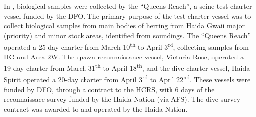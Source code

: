 In \thisYr{}, biological samples were collected by the ``Queens Reach'', a seine test charter vessel funded by the DFO. 
The primary purpose of the test charter vessel was to collect biological samples from main bodies of herring from Haida Gwaii major (priority) and minor stock areas, identified from soundings. 
The ``Queens Reach'' operated a 25-day charter from March 10\textsuperscript{th} to April 3\textsuperscript{rd}, collecting samples from HG and Area 2W. 
The spawn reconnaissance vessel, Victoria Rose, operated a 19-day charter from March 31\textsuperscript{th} to April 18\textsuperscript{th}, and the dive charter vessel, Haida Spirit operated a 20-day charter from April 3\textsuperscript{rd} to April 22\textsuperscript{nd}. 
These vessels were funded by DFO, through a contract to the HCRS, with 6 days of the reconnaissace survey funded by the Haida Nation (via AFS). 
The dive survey contract was awarded to and operated by the Haida Nation.